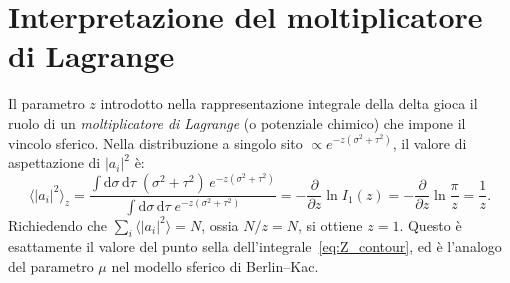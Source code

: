 \documentclass[a4paper,11pt]{article}
\newcommand{\de}{\mathrm{d}}
\begin{document}
\section{Interpretazione del moltiplicatore di Lagrange}

Il parametro $z$ introdotto nella rappresentazione integrale della delta
gioca il ruolo di un \emph{moltiplicatore di Lagrange} (o potenziale
chimico) che impone il vincolo sferico.  Nella distribuzione a singolo
sito $\propto e^{-z(\sigma^2 + \tau^2)}$, il valore di aspettazione di
$|a_i|^2$ è:
\begin{equation}
  \langle |a_i|^2 \rangle_z
  = \frac{\displaystyle\int \de\sigma\,\de\tau\;
          (\sigma^2 + \tau^2)\,e^{-z(\sigma^2+\tau^2)}}
         {\displaystyle\int \de\sigma\,\de\tau\;
          e^{-z(\sigma^2+\tau^2)}}
  = -\frac{\partial}{\partial z} \ln I_1(z)
  = -\frac{\partial}{\partial z} \ln\frac{\pi}{z}
  = \frac{1}{z} .
\end{equation}
Richiedendo che $\sum_i \langle |a_i|^2 \rangle = N$, ossia
$N/z = N$, si ottiene $z = 1$. Questo è esattamente il valore del punto
sella dell'integrale~\eqref{eq:Z_contour}, ed è l'analogo del parametro
$\mu$ nel modello sferico di Berlin--Kac.
\end{document}
